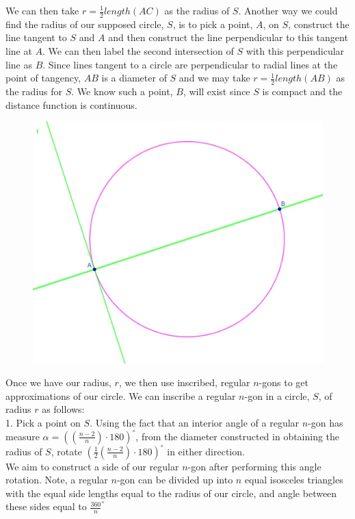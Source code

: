 \documentclass[11pt]{article}
\begin{document}
We can then take \(r = \frac{1}{2}length(AC)\) as the radius of \(S\).
\newpage
Another way we could find the radius of our supposed circle, \(S\), is to pick a point, \(A\), on \(S\), construct the line tangent to \(S\) and \(A\) and then construct the line perpendicular to this tangent line at \(A\).  We can then label the second intersection of \(S\) with this perpendicular line as \(B\).  Since lines tangent to a circle are perpendicular to  radial lines at the point of tangency, \(AB\) is a diameter of \(S\) and we may take \(r=\frac{1}{2}length(AB)\) as the radius for \(S\).  We know such a point, \(B\), will exist since \(S\) is compact and the distance function is continuous.
\begin{center}
	\begin{figure}[h]
		\includegraphics[scale=0.5]{circle_2_1.jpg}
	\end{figure}
\end{center}
Once we have our radius, \(r\), we then use inscribed, regular \(n\)-gons to get approximations of our circle. We can inscribe a regular \(n\)-gon in a circle, \(S\), of radius \(r\) as follows:
\\[1\baselineskip]
1. Pick a point on \(S\).  Using the fact that an interior angle of a regular \(n\)-gon has measure \(\alpha = ((\frac{n-2}{n})\cdot 180)^{\circ}\), from the diameter constructed in obtaining the radius of \(S\), rotate \((\frac{1}{2}(\frac{n-2}{n})\cdot 180)^{\circ}\) in either direction.
\\[1\baselineskip]
We aim to construct a side of our regular \(n\)-gon after performing this angle rotation.  Note, a regular \(n\)-gon can be divided up into \(n\) equal isosceles triangles with the equal side lengths equal to the radius of our circle, and angle between these sides equal to \(\frac{360}{n}^{\circ}\) 
\end{document}
